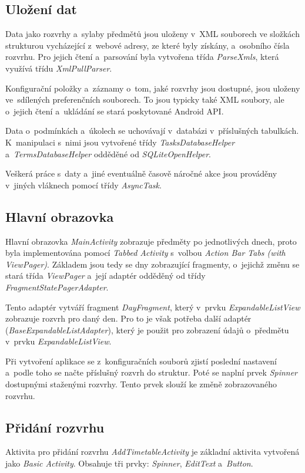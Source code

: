 \documentclass[12pt, a4paper]{article}
\begin{document}
		\subsection{Uložení dat}
		Data jako rozvrhy a~sylaby předmětů jsou uloženy v~XML souborech ve složkách strukturou vycházející z~webové adresy, ze které byly získány, a~osobního čísla rozvrhu. Pro jejich čtení a~parsování byla vytvořena třída \emph{ParseXmls}, která využívá třídu \emph{XmlPullParser}.
		
		Konfigurační položky a~záznamy o~tom, jaké rozvrhy jsou dostupné, jsou uloženy ve~sdílených preferenčních souborech. To jsou typicky také XML soubory, ale o~jejich čtení a~ukládání se stará poskytované Android API.
		
		Data o~podmínkách a~úkolech se uchovávají v~databázi v~příslušných tabulkách. K~manipulaci s~nimi jsou vytvořené třídy \emph{TasksDatabaseHelper} a~\emph{TermsDatabaseHelper} odděděné od \emph{SQLiteOpenHelper}.
		
		Veškerá práce s~daty a~jiné eventuálně časově náročné akce jsou prováděny v~jiných vláknech pomocí třídy \emph{AsyncTask}.
		
		\subsection{Hlavní obrazovka}
		Hlavní obrazovka \emph{MainActivity} zobrazuje předměty po jednotlivých dnech, proto byla implementována pomocí \emph{Tabbed Activity} s~volbou \emph{Action Bar Tabs (with ViewPager)}. Základem jsou tedy  se dny zobrazující fragmenty, o~jejichž změnu se stará třída \emph{ViewPager} a~její adaptér odděděný od třídy \emph{FragmentStatePagerAdapter}.
		
		Tento adaptér vytváří fragment \emph{DayFragment}, který v~prvku \emph{ExpandableListView} zobrazuje rozvrh pro daný den. Pro to je však potřeba další adaptér (\emph{BaseExpandableListAdapter}), který je použit pro zobrazení údajů o~předmětu v~prvku \emph{ExpandableListView}.
		
		Při vytvoření aplikace se z~konfiguračních souborů zjistí poslední nastavení a~podle toho se načte příslušný rozvrh do struktur. Poté se naplní prvek \emph{Spinner} dostupnými staženými rozvrhy. Tento prvek slouží ke změně zobrazovaného rozvrhu.
		
		\subsection{Přidání rozvrhu}
		Aktivita pro přidání rozvrhu \emph{AddTimetableActivity} je základní aktivita vytvořená jako \emph{Basic Activity}. Obsahuje tři prvky: \emph{Spinner}, \emph{EditText} a~\emph{Button}.
		
\end{document}
